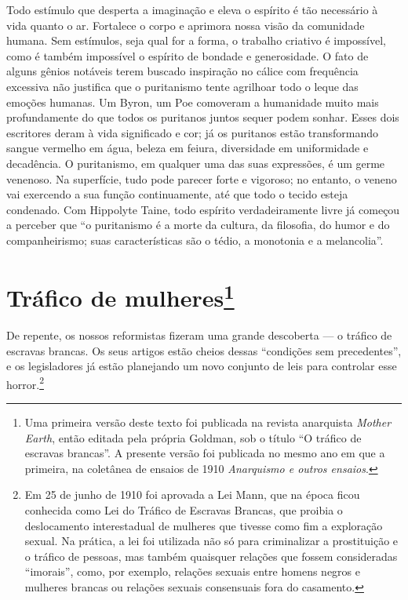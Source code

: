 Todo estímulo que desperta a imaginação e eleva o espírito é tão
necessário à vida quanto o ar. Fortalece o corpo e aprimora nossa visão
da comunidade humana. Sem estímulos, seja qual for a forma, o trabalho
criativo é impossível, como é também impossível o espírito de bondade e
generosidade. O fato de alguns gênios notáveis terem buscado inspiração
no cálice com frequência excessiva não justifica que o puritanismo
tente agrilhoar todo o leque das emoções humanas. Um Byron, um Poe
comoveram a humanidade muito mais profundamente do que todos os
puritanos juntos sequer podem sonhar. Esses dois escritores deram à vida
significado e cor; já os puritanos estão transformando sangue vermelho
em água, beleza em feiura, diversidade em uniformidade e decadência. O
puritanismo, em qualquer uma das suas expressões, é um germe venenoso.
Na superfície, tudo pode parecer forte e vigoroso; no entanto, o veneno
vai exercendo a sua função continuamente, até que todo o tecido esteja
condenado. Com Hippolyte Taine, todo espírito verdadeiramente livre já
começou a perceber que ``o puritanismo é a morte da cultura, da
filosofia, do humor e do companheirismo; suas características são o
tédio, a monotonia e a melancolia''.

\chapter{Tráfico de mulheres\footnote{Uma primeira versão deste texto foi
  publicada na revista anarquista \emph{Mother Earth}, então editada
  pela própria Goldman, sob o título ``O tráfico de escravas
  brancas''. A presente versão foi publicada no mesmo ano em que a
  primeira, na coletânea de ensaios de 1910 \emph{Anarquismo e outros
  ensaios}.}}\label{trafico}

De repente, os nossos reformistas fizeram uma grande descoberta --- o
tráfico de escravas brancas. Os seus artigos estão cheios dessas
``condições sem precedentes'', e os legisladores já estão planejando um
novo conjunto de leis para controlar esse horror.\footnote{Em 25 de
  junho de 1910 foi aprovada a Lei Mann, que na época ficou conhecida
  como Lei do Tráfico de Escravas Brancas, que proibia o deslocamento
  interestadual de mulheres que tivesse como fim a exploração sexual. Na
  prática, a lei foi utilizada não só para criminalizar a prostituição e
  o tráfico de pessoas, mas também quaisquer relações que fossem
  consideradas ``imorais'', como, por exemplo, relações sexuais entre
  homens negros e mulheres brancas ou relações sexuais consensuais fora
  do casamento.}


